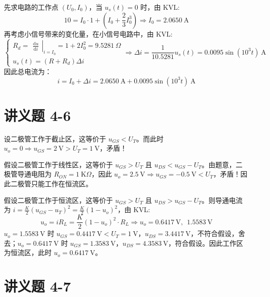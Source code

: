\documentclass[UTF8]{report}
\def\kO{\ \mathrm{K}\Omega}
\theoremstyle{MyLineTheoremStyle} %
\theoremstyle{MyBlockTheoremStyle} %
\theoremstyle{MySubsubsectionStyle} %
\begin{document}
先求电路的工作点 $(U_0, I_0)$，当 $u_s(t) = 0$ 时，由 KVL:
\begin{equation}
10 = I_0\cdot 1 + \left(I_0 + \frac{2}{3}I_0^3\right) \Longrightarrow I_0 = 2.0650 \ \mathrm{A}
\end{equation}
再考虑小信号带来的变化量，在小信号电路中，由 KVL:
\begin{equation}
\begin{cases}
R_d = 
\left.\begin{matrix}
    \frac{\mathrm{d} u }{\mathrm{d} i } 
\end{matrix}\right|_{i = I_0} = 1+2I_0^2 =  9.5281 \ \Omega \\
u_s(t) = (R + R_d)\Delta i
\end{cases}\Longrightarrow 
\Delta i = \frac{1}{10.5281}u_s(t) = 0.0095 \sin (10^3 t) \ \mathrm{A}
\end{equation}
因此总电流为：
\begin{equation}
i = I_0 + \Delta i = 2.0650 \ \mathrm{A} + 0.0095 \sin (10^3 t) \ \mathrm{A}
\end{equation}

\section{讲义题 4-6}\label{讲义题 4-6}
设二极管工作于截止区，这等价于 $u_{GS} < U_T$。而此时 $u_o = 0 \Longrightarrow u_{GS} = 2 \ \mathrm{V} > U_T = 1 \ \mathrm{V}$，矛盾！

假设二极管工作于线性区，这等价于 $u_{GS} > U_T$ 且 $u_{DS} < u_{GS} - U_T$。由题意，二极管导通电阻为 $R_{ON} = 1 \kO$，因此 $u_o = 2.5 \ \mathrm{V} \Longrightarrow u_{GS} = -0.5 \ \mathrm{V} < U_T$，矛盾！因此二极管只能工作在恒流区。

假设二极管工作于恒流区，这等价于 $u_{GS} > U_T$ 且 $u_{DS} > u_{GS} - U_T$。则导通电流为 $i = \frac{K}{2}\left(u_{GS} - u_{T}\right)^2 = \frac{K}{2}\left(1-u_o\right)^2$，由 KVL:
\begin{equation}
u_o = iR_L =  \frac{K}{2}\left(1-u_o\right)^2\cdot R_L\Longrightarrow u_o = 0.6417 \ \mathrm{V},\ \ 1.5583 \ \mathrm{V}
\end{equation}
$u_o = 1.5583 \ \mathrm{V}$ 时 $u_{GS} = 0.4417\ \mathrm{V} < U_T = 1 \ \mathrm{V}$，$u_{DS} = 3.4417 \ \mathrm{V}$，不符合假设，舍去；$u_o = 0.6417 \ \mathrm{V}$ 时 $u_{GS} = 1.3583\ \mathrm{V}$，$u_{DS} = 4.3583 \ \mathrm{V}$，符合假设。因此工作区为恒流区，此时 $u_o = 0.6417 \ \mathrm{V}$。

\section{讲义题 4-7}
\end{document}
